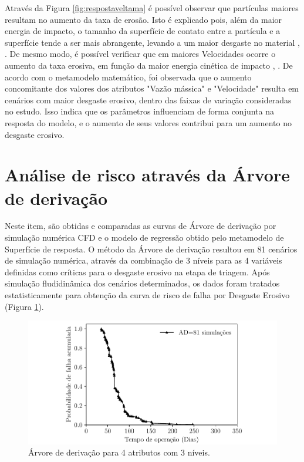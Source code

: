 Através da Figura \ref{fig:respostaveltama} é possível observar que partículas maiores resultam no aumento da taxa de erosão. Isto é explicado pois, além da maior energia de impacto, o tamanho da superfície de contato entre a partícula e a superfície tende a ser mais abrangente, levando a um maior desgaste no material \cite{lieb}, \cite{clark}. De mesmo modo, é possível verificar que em maiores Velocidades ocorre o aumento da taxa erosiva, em função da maior energia cinética de impacto \cite{lind}, \cite{finnie2}. De acordo com o metamodelo matemático, foi observada que o aumento concomitante dos valores dos atributos "Vazão mássica" e "Velocidade" resulta em cenários com maior desgaste erosivo, dentro das faixas de variação consideradas no estudo. Isso indica que os parâmetros influenciam de forma conjunta na resposta do modelo, e o aumento de seus valores contribui para um aumento no desgaste erosivo.

\section{Análise de risco através da Árvore de derivação}

Neste item, são obtidas e comparadas as curvas de Árvore de derivação por simulação numérica CFD e o modelo de regressão obtido pelo metamodelo de Superfície de resposta. O método da Árvore de derivação resultou em 81 cenários de simulação numérica, através da combinação de 3 níveis para as 4 variáveis definidas como críticas para o desgaste erosivo na etapa de triagem. Após simulação fludidinâmica dos cenários determinados, os dados foram tratados estatisticamente para obtenção da curva de risco de falha por Desgaste Erosivo (Figura \ref{fig:ad}).


\begin{figure}[H] 
    \centering  
    \includegraphics{Figuras/AD.pdf}  
    \caption{Árvore de derivação para 4 atributos com 3 níveis.}  
    \label{fig:ad}  
\end{figure}

